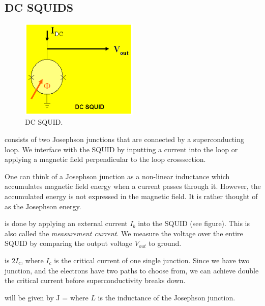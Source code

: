 \subsection{DC SQUIDS}
\begin{description}

\begin{figure}[h]
  \caption{DC SQUID.}
  \centering
    \includegraphics[width=0.5\textwidth]{./SC_figures/DC_SQUID.PNG}
\end{figure}

\item[DC SQUID] consists of two Josephson junctions that are connected by a superconducting loop. We interface with the SQUID by inputting a current into the loop or applying a magnetic field perpendicular to the loop crosssection. 

\item[Josephson junction analogue] One can think of a Josephson junction as a non-linear inductance which accumulates magnetic field energy when a current passes through it. However, the accumulated energy is not expressed in the magnetic field. It is rather thought of as the Josephson energy. 


\item[Measurement of DC SQUID] is done by applying an external current $I_b$ into the SQUID (see figure). This is also called the \emph{measurement current}. We measure the voltage over the entire SQUID by comparing the output voltage $V_{out}$ to ground. 

\item[Measured critical current] is $2I_c$, where $I_c$ is the critical current of one single junction. Since we have two junction, and the electrons have two paths to choose from, we can achieve double the critical current before superconductivity breaks down. 

\item[Circulating supercurrent] will be given by 
\beq
J = 
\eeq
where $L$ is the inductance of the Josephson junction. 


\end{description}
